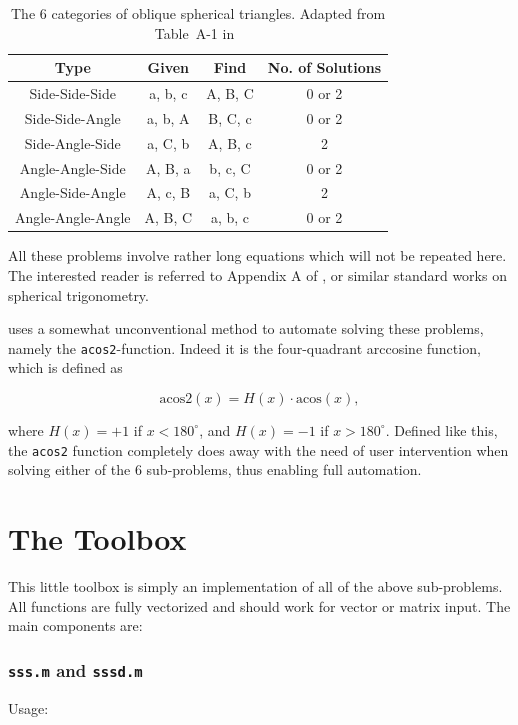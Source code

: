 \documentclass{report}
\begin{document}
\begin{table}[h!]
  \centering
  \caption{The 6 categories of oblique spherical triangles.
  Adapted from Table~A-1 in~\cite{Wertz2001}}
  \label{table}
  \begin{tabular}{|c||c|c|c|}\hline
         \textbf{Type}   & \textbf{Given} & \textbf{Find} &
         \textbf{No. of Solutions}\\\hline
         Side-Side-Side  & a, b, c & A, B, C & 0 or 2\\
         Side-Side-Angle & a, b, A & B, C, c & 0 or 2\\
         Side-Angle-Side & a, C, b & A, B, c & 2\\
         Angle-Angle-Side & A, B, a & b, c, C & 0 or 2\\
         Angle-Side-Angle & A, c, B & a, C, b & 2\\
         Angle-Angle-Angle & A, B, C & a, b, c & 0 or 2\\\hline
  \end{tabular}
\end{table}

All these problems involve rather long equations which will not be
repeated here. The interested reader is referred to Appendix A of
\cite{Wertz2001}, or similar standard works on spherical
trigonometry.

\cite{Wertz2001} uses a somewhat unconventional method to automate
solving these problems, namely the \texttt{acos2}-function. Indeed
it is the four-quadrant arccosine function, which is defined as

\[
        \text{acos2}(x) = H(x)\cdot \text{acos}(x),
\]

where $H(x) = +1$ if $x < 180^\circ$, and $H(x) = -1$ if $x >
180^\circ$. Defined like this, the \texttt{acos2} function
completely does away with the need of user intervention when
solving either of the 6 sub-problems, thus enabling full
automation.

\section*{The Toolbox}
This little toolbox is simply an implementation of all of the
above sub-problems. All functions are fully vectorized and should
work for vector or matrix input. The main components are:

\subsubsection{\texttt{sss.m} and \texttt{sssd.m}}
Usage:
\end{document}
